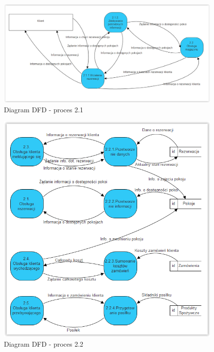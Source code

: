 \documentclass[a4paper, 11pt]{article}
\begin{document}
	\begin{figure}[H]%
			\center
			\includegraphics[scale=0.7]{Img/2-1.png}
			\caption{Diagram DFD - proces 2.1}
	\end{figure}
	\begin{figure}[H]%
			\center
			\includegraphics[scale=0.7]{Img/2-2.png}
			\caption{Diagram DFD - proces 2.2}
	\end{figure}
\end{document}
